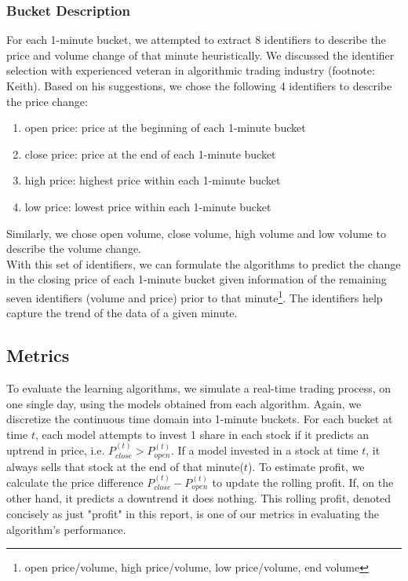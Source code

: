 \documentclass[10pt,twocolumn,letterpaper]{article}
\begin{document}
\subsubsection{Bucket Description}
For each 1-minute bucket, we attempted to extract 8 identifiers to describe the price and volume change of that minute heuristically. We discussed the identifier selection with experienced veteran in algorithmic trading industry (footnote: Keith). Based on his suggestions, we chose the following 4 identifiers to describe the price change:
\begin{enumerate}
\item open price: price at the beginning of each 1-minute bucket
\item close price: price at the end of each 1-minute bucket
\item high price: highest price within each 1-minute bucket
\item low price: lowest price within each 1-minute bucket
\end{enumerate}
Similarly, we chose open volume, close volume, high volume and low volume to describe the volume change.\\

With this set of identifiers, we can formulate the algorithms to predict the change in the closing price of each 1-minute bucket given information of the remaining seven identifiers (volume and price) prior to that minute\footnote{open price/volume, high price/volume, low price/volume, end volume}. The identifiers help capture the trend of the data of a given minute.

\subsection{Metrics}
To evaluate the learning algorithms, we simulate a real-time trading process, on one single day, using the models obtained from each algorithm. Again, we discretize the continuous time domain into 1-minute buckets. For each bucket at time $t$, each model attempts to invest 1 share in each stock if it predicts an uptrend in price, i.e.  $P_{close}^{(t)}> P_{open}^{(t)}$. If a model invested in a stock at time $t$, it always sells that stock at the end of that minute($t$). To estimate profit, we calculate the price difference $P_{close}^{(t)}-P_{open}^{(t)}$ to update the rolling profit. If, on the other hand, it predicts a downtrend it does nothing. This rolling profit, denoted concisely as just "profit" in this report, is one of our metrics in evaluating the algorithm's performance.\\
\end{document}
